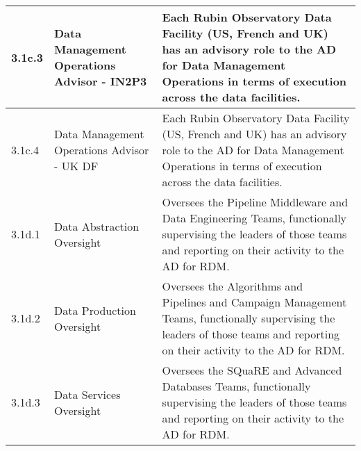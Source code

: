 \begin{longtable} {|p{}|p{}|p{}|}
{3.1c.3}&{Data Management Operations Advisor - IN2P3}&{Each Rubin Observatory Data Facility (US, French and UK) has an advisory role to the AD for Data Management Operations in terms of execution across the data facilities.  } \\ \hline
{3.1c.4}&{Data Management Operations Advisor - UK DF}&{Each Rubin Observatory Data Facility (US, French and UK) has an advisory role to the AD for Data Management Operations in terms of execution across the data facilities.  } \\ \hline
{3.1d.1}&{Data Abstraction Oversight}&{Oversees the Pipeline Middleware and Data Engineering Teams, functionally supervising the leaders of those teams and reporting on their activity to the AD for RDM. } \\ \hline
{3.1d.2}&{Data Production Oversight}&{Oversees the Algorithms and Pipelines and Campaign Management Teams, functionally supervising the leaders of those teams and reporting on their activity to the AD for RDM. } \\ \hline
{3.1d.3}&{Data Services Oversight}&{Oversees the SQuaRE and Advanced Databases Teams, functionally supervising the leaders of those teams and reporting on their activity to the AD for RDM. } \\ \hline
\end{longtable} \normalsize
